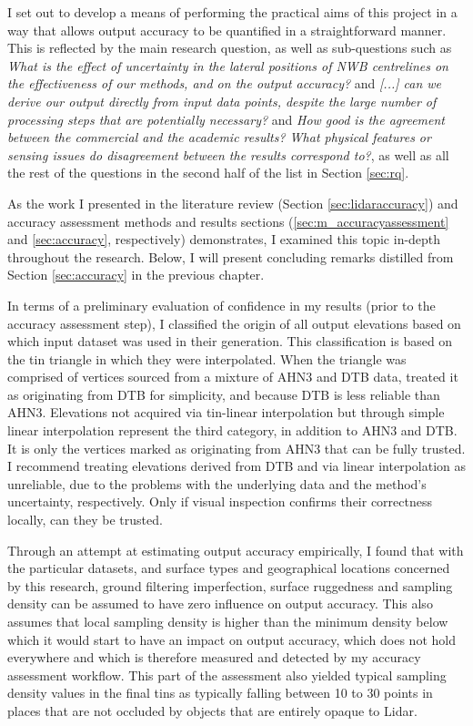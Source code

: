 I set out to develop a means of performing the practical aims of this project in a way that allows output accuracy to be quantified in a straightforward manner. This is reflected by the main research question, as well as sub-questions such as \textit{What is the effect of uncertainty in the lateral positions of NWB centrelines on the effectiveness of our methods, and on the output accuracy?} and \textit{[...] can we derive our output directly from input data points, despite the large number of processing steps that are potentially necessary?} and \textit{How good is the agreement between the commercial and the academic results? What physical features or sensing issues do disagreement between the results correspond to?}, as well as all the rest of the questions in the second half of the list in Section \ref{sec:rq}.

As the work I presented in the literature review (Section \ref{sec:lidaraccuracy}) and accuracy assessment methods and results sections (\ref{sec:m_accuracyassessment} and \ref{sec:accuracy}, respectively) demonstrates, I examined this topic in-depth throughout the research. Below, I will present concluding remarks distilled from Section \ref{sec:accuracy} in the previous chapter.

In terms of a preliminary evaluation of confidence in my results (prior to the accuracy assessment step), I classified the origin of all output elevations based on which input dataset was used in their generation. This classification is based on the \ac{tin} triangle in which they were interpolated. When the triangle was comprised of vertices sourced from a mixture of AHN3 and DTB data, treated it as originating from DTB for simplicity, and because DTB is less reliable than AHN3. Elevations not acquired via \ac{tin}-linear interpolation but through simple linear interpolation represent the third category, in addition to AHN3 and DTB. It is only the vertices marked as originating from AHN3 that can be fully trusted. I recommend treating elevations derived from DTB and via linear interpolation as unreliable, due to the problems with the underlying data and the method's uncertainty, respectively. Only if visual inspection confirms their correctness locally, can they be trusted.

Through an attempt at estimating output accuracy empirically, I found that with the particular datasets, and surface types and geographical locations concerned by this research, ground filtering imperfection, surface ruggedness and sampling density can be assumed to have zero influence on output accuracy. This also assumes that local sampling density is higher than the minimum density below which it would start to have an impact on output accuracy, which does not hold everywhere and which is therefore measured and detected by my accuracy assessment workflow. This part of the assessment also yielded typical sampling density values in the final \ac{tin}s as typically falling between 10 to 30 points in places that are not occluded by objects that are entirely opaque to Lidar.

